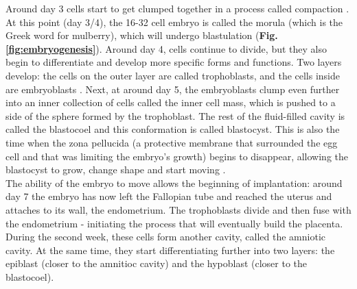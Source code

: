 Around day 3 cells start to get clumped together in a process called compaction \cite{iwata2014analysis}.
At this point (day 3/4), the 16-32 cell embryo is called the morula (which is the Greek word for mulberry), which will undergo blastulation \cite{wong2010non} (\textbf{Fig. \ref{fig:embryogenesis}}).
Around day 4, cells continue to divide, but they also begin to differentiate and develop more specific forms and functions.
Two layers develop: the cells on the outer layer are called trophoblasts, and the cells inside are embryoblasts
\cite{petropoulos2016single, niakan2013analysis}. 
Next, at around day 5, the embryoblasts clump even further into an inner collection of cells called the inner cell mass, which is pushed to a side of the sphere formed by the trophoblast.
The rest of the fluid-filled cavity is called the blastocoel and this conformation is called blastocyst.
This is also the time when the zona pellucida (a protective membrane that surrounded the egg cell and that was limiting the embryo's growth) begins to disappear, allowing the blastocyst to grow, change shape and start moving \cite{larsen2001human}.\\

The ability of the embryo to move allows the beginning of implantation: around day 7 the embryo has now left the Fallopian tube and reached the uterus and attaches to its wall, the endometrium.
The trophoblasts divide and then fuse with the endometrium -
initiating the process that 
will eventually build the placenta.\\

During the second week, these cells form another cavity, called the amniotic cavity. 
At the same time, they start differentiating further into two layers: the epiblast (closer to the amnitioc cavity) and the hypoblast (closer to the blastocoel). 

